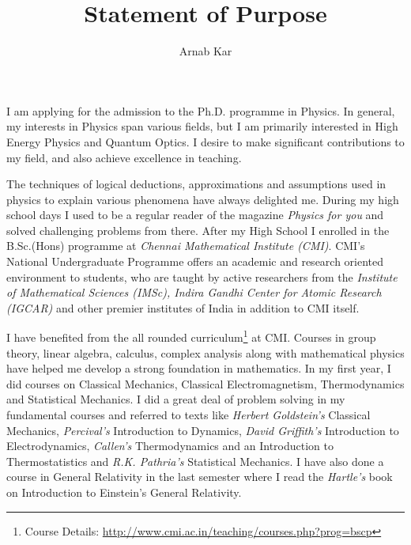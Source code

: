 \documentclass[12pt,a4paper,oneside]{amsart}
\title{Statement of Purpose}
\author{\small{Arnab Kar}}
\begin{document}
\maketitle
\fancyhead{}
\fancyfoot{}

\cfoot{\thepage}

I am applying for the admission to the Ph.D. programme in Physics. In general, my interests in Physics span various fields, but I am primarily interested in High Energy Physics and Quantum Optics. I desire to make significant contributions to my field, and also achieve excellence in teaching.

The techniques of logical deductions, approximations and assumptions used in physics to explain various phenomena have always delighted me. During my high school days I used to be a regular reader of the magazine \textit{Physics for you} and solved challenging problems from there. After my High School I enrolled in the B.Sc.(Hons) programme at \textit{Chennai Mathematical Institute (CMI)}. CMI's National Undergraduate Programme offers an academic and research oriented environment to students, who are taught by active researchers from the \textit{Institute of Mathematical Sciences (IMSc), Indira Gandhi Center for Atomic Research (IGCAR)} and other premier institutes of India in addition to CMI itself.

I have benefited from the all rounded curriculum\footnote{Course Details: \url{http://www.cmi.ac.in/teaching/courses.php?prog=bscp}} at CMI. Courses in group theory, linear algebra, calculus, complex analysis along with mathematical physics have helped me develop a strong foundation in mathematics. In my first year, I did courses on Classical Mechanics, Classical Electromagnetism,  Thermodynamics and Statistical Mechanics. I did a great deal of problem solving in my fundamental courses and referred to texts like \textit{Herbert Goldstein's} Classical Mechanics, \textit{Percival's} Introduction to Dynamics, \textit{David Griffith's} Introduction to Electrodynamics, \textit{Callen's} Thermodynamics and an Introduction to Thermostatistics and \textit{R.K. Pathria's} Statistical Mechanics. I have also done a course in General Relativity in the last semester where I read the \textit{Hartle's} book on Introduction to Einstein's General Relativity. 
\end{document}
